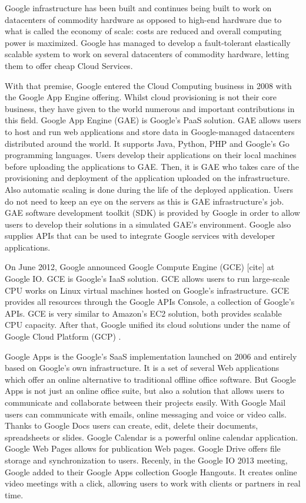 Google infrastructure has been built and continues being built to work on datacenters of commodity hardware as opposed to high-end hardware due to what is called the economy of scale: costs are reduced and overall computing power is maximized. Google has managed to develop a fault-tolerant elastically scalable system to work on several datacenters of commodity hardware, letting them to offer cheap Cloud Services.
\par
With that premise, Google entered the Cloud Computing business in 2008 with the Google App Engine offering. Whilst cloud provisioning is not their core business, they have given to the world numerous and important contributions in this field.
Google App Engine (GAE) is Google's PaaS solution. GAE allows users to host and run web applications and store data in Google-managed datacenters distributed around the world. It supports Java, Python, PHP and Google's Go programming languages. Users develop their applications on their local machines before uploading the applications to GAE. Then, it is GAE who takes care of the provisioning and deployment of the application uploaded on the infrastructure. Also automatic scaling is done during the life of the deployed application. Users do not need to keep an eye on the servers as this is GAE infrastructure's job. GAE software development toolkit (SDK) is provided by Google in order to allow users to develop their solutions in a simulated GAE's environment. Google also supplies APIs that can be used to integrate Google services with developer applications.
\par
On June 2012, Google announced Google Compute Engine (GCE) [cite] at Google IO. GCE is Google's IaaS solution. GCE allows users to run large-scale CPU works on Linux virtual machines hosted on Google's infrastructure. GCE provides all resources through the Google APIs Console, a collection of Google's APIs. GCE is very similar to Amazon's EC2 solution, both provides scalable CPU capacity. 
After that, Google unified its cloud solutions under the name of Google Cloud Platform (GCP) \cite{CloudGoogle}. 
\par
Google Apps \cite{GoogleApps} is the Google's SaaS implementation launched on 2006 and entirely based on Google's own infrastructure. It is a set of several Web applications which offer an online alternative to traditional offline office software. But Google Apps is not just an online office suite, but also a solution that allows users to communicate and collaborate between their projects easily. With Google Mail users can communicate with emails, online messaging and voice or video calls. Thanks to Google Docs users can create, edit, delete their documents, spreadsheets or slides. Google Calendar is a powerful online calendar application. Google Web Pages allows for publication Web pages. Google Drive offers file storage and synchronization to users. Recenly, in the Google IO 2013 meeting, Google added to their Google Apps collection Google Hangouts. It creates online video meetings with a click, allowing users to work with clients or partners in real time.
